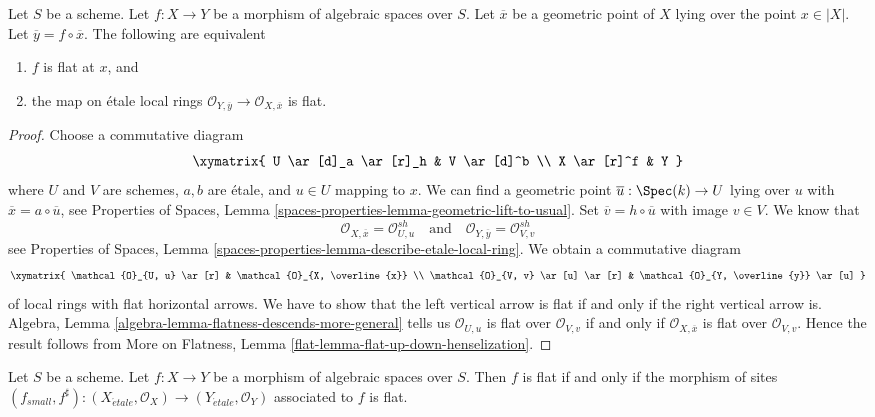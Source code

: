 \begin{lemma}
\label{lemma-flat-at-point-etale-local-rings}
Let $S$ be a scheme.
Let $f : X \to Y$ be a morphism of algebraic spaces over $S$.
Let $\overline{x}$ be a geometric point of $X$ lying over the point
$x \in |X|$. Let $\overline{y} = f \circ \overline{x}$. The following
are equivalent
\begin{enumerate}
\item $f$ is flat at $x$, and
\item the map on \'etale local rings
$\mathcal{O}_{Y, \overline{y}} \to \mathcal{O}_{X, \overline{x}}$
is flat.
\end{enumerate}
\end{lemma}

\begin{proof}
Choose a commutative diagram
$$
\xymatrix{
U \ar[d]_a \ar[r]_h & V \ar[d]^b \\
X \ar[r]^f & Y
}
$$
where $U$ and $V$ are schemes, $a, b$ are \'etale, and
$u \in U$ mapping to $x$. We can find a geometric point
$\overline{u} : \Spec(k) \to U$ lying over $u$ with
$\overline{x} = a \circ \overline{u}$, see
Properties of Spaces, Lemma
\ref{spaces-properties-lemma-geometric-lift-to-usual}.
Set $\overline{v} = h \circ \overline{u}$ with image $v \in V$.
We know that
$$
\mathcal{O}_{X, \overline{x}} = \mathcal{O}_{U, u}^{sh}
\quad\text{and}\quad
\mathcal{O}_{Y, \overline{y}} = \mathcal{O}_{V, v}^{sh}
$$
see
Properties of Spaces, Lemma
\ref{spaces-properties-lemma-describe-etale-local-ring}.
We obtain a commutative diagram
$$
\xymatrix{
\mathcal{O}_{U, u} \ar[r] &
\mathcal{O}_{X, \overline{x}} \\
\mathcal{O}_{V, v} \ar[u] \ar[r] &
\mathcal{O}_{Y, \overline{y}} \ar[u]
}
$$
of local rings with flat horizontal arrows. We have to show that the
left vertical arrow is flat if and only if the right vertical arrow is.
Algebra, Lemma \ref{algebra-lemma-flatness-descends-more-general}
tells us $\mathcal{O}_{U, u}$ is flat over $\mathcal{O}_{V, v}$
if and only if $\mathcal{O}_{X, \overline{x}}$ is flat over
$\mathcal{O}_{V, v}$. Hence the result follows from
More on Flatness, Lemma \ref{flat-lemma-flat-up-down-henselization}.
\end{proof}

\begin{lemma}
\label{lemma-flat-morphism-sites}
Let $S$ be a scheme.
Let $f : X \to Y$ be a morphism of algebraic spaces over $S$.
Then $f$ is flat if and only if the morphism of sites
$
(f_{small}, f^\sharp) :
(X_{\acute{e}tale}, \mathcal{O}_X)
\to
(Y_{\acute{e}tale}, \mathcal{O}_Y)
$
associated to $f$ is flat.
\end{lemma}

